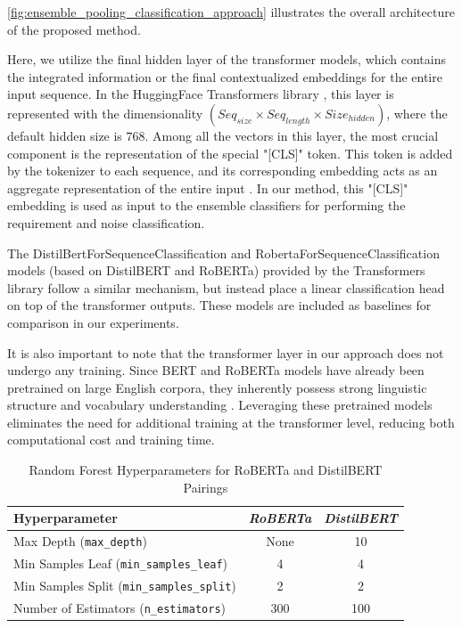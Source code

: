 \documentclass[sigconf,review]{acmart}
\begin{document}
\autoref{fig:ensemble_pooling_classification_approach} illustrates the overall architecture of the proposed method.


Here, we utilize the final hidden layer of the transformer models, which contains the integrated information or the final contextualized embeddings for the entire input sequence. In the HuggingFace Transformers library \cite{sanh2019distilbert}, this layer is represented with the dimensionality $(Seq_{size} \times Seq_{length} \times Size_{hidden})$, where the default hidden size is $768$. Among all the vectors in this layer, the most crucial component is the representation of the special "[CLS]" token. This token is added by the tokenizer to each sequence, and its corresponding embedding acts as an aggregate representation of the entire input \cite{devlin2018bert} \cite{sarzynska2021detecting}. In our method, this "[CLS]" embedding is used as input to the ensemble classifiers for performing the requirement and noise classification.

The DistilBertForSequenceClassification and RobertaForSequenceClassification models (based on DistilBERT and RoBERTa) provided by the Transformers library follow a similar mechanism, but instead place a linear classification head on top of the transformer outputs. These models are included as baselines for comparison in our experiments.

It is also important to note that the transformer layer in our approach does not undergo any training. Since BERT and RoBERTa models have already been pretrained on large English corpora, they inherently possess strong linguistic structure and vocabulary understanding \cite{sanh2019distilbert} \cite{liu2019roberta}. Leveraging these pretrained models eliminates the need for additional training at the transformer level, reducing both computational cost and training time.

\begin{table}[b]
\caption{Random Forest Hyperparameters for RoBERTa and DistilBERT Pairings}
\centering
\footnotesize
\renewcommand{\arraystretch}{1.12}
\begin{tabular}{lcc}
\hline
\textbf{Hyperparameter} & \textbf{\textit{RoBERTa}} & \textbf{\textit{DistilBERT}} \\
\hline
Max Depth (\texttt{max\_depth})                 & None & 10  \\
Min Samples Leaf (\texttt{min\_samples\_leaf})  & 4    & 4   \\
Min Samples Split (\texttt{min\_samples\_split})& 2    & 2   \\
Number of Estimators (\texttt{n\_estimators})   & 300  & 100 \\
\hline
\end{tabular}
\label{tab:rf_hyperparameters}
\end{table}
\end{document}
